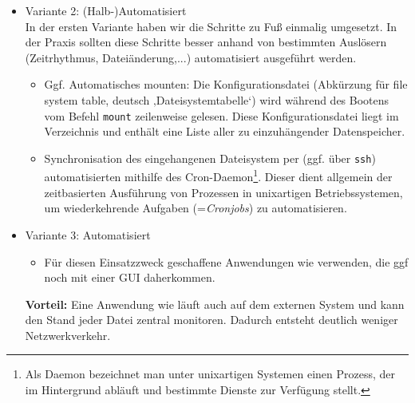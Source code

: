 \begin{itemize}
{\begin{itemize}
\end{itemize}
}
\item Variante 2: (Halb-)Automatisiert\\
In der ersten Variante haben wir die Schritte zu Fuß einmalig umgesetzt. In der Praxis sollten diese Schritte besser anhand von bestimmten Auslösern (Zeitrhythmus, Dateiänderung,...) automatisiert ausgeführt werden.
\begin{itemize}
	\item Ggf. Automatisches mounten: Die Konfigurationsdatei  (Abkürzung für file system table, deutsch ‚Dateisystemtabelle‘) wird während des Bootens vom Befehl \texttt{mount} zeilenweise gelesen. Diese Konfigurationsdatei liegt im Verzeichnis  und enthält eine Liste aller zu einzuhängender Datenspeicher. 
	\item Synchronisation des eingehangenen Dateisystem per  (ggf. über \texttt{ssh}) automatisierten mithilfe des Cron-Daemon\footnote{Als Daemon bezeichnet man unter unixartigen Systemen einen Prozess, der im Hintergrund abläuft und bestimmte Dienste zur Verfügung stellt.}. Dieser dient allgemein der zeitbasierten Ausführung von Prozessen in unixartigen Betriebssystemen, um wiederkehrende Aufgaben (=\textit{Cronjobs}) zu automatisieren.
\end{itemize}
\item Variante 3: Automatisiert
\begin{itemize}
	\item Für diesen Einsatzzweck geschaffene Anwendungen wie  verwenden, die ggf noch mit einer GUI daherkommen.
\end{itemize}
\textbf{Vorteil:} Eine Anwendung wie  läuft auch auf dem externen System und kann den Stand jeder Datei zentral monitoren. Dadurch entsteht deutlich weniger Netzwerkverkehr.
\end{itemize}
